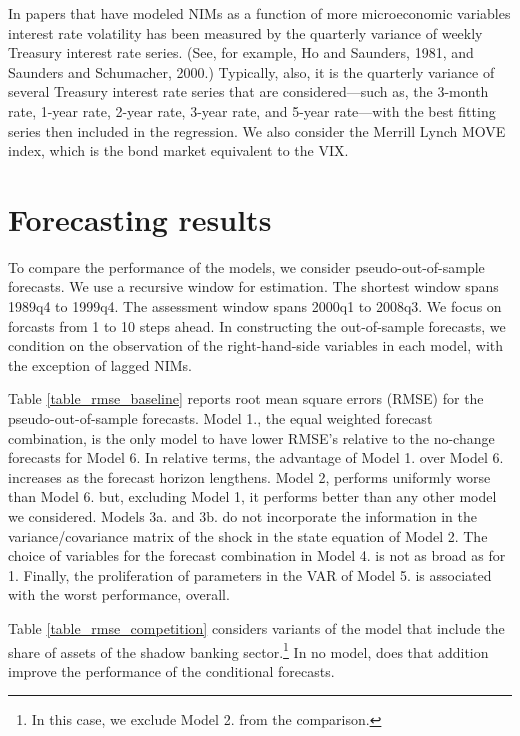 \documentclass[11pt]{article}
\renewcommand{\baselinestretch}{1.5}
\begin{document}
In papers that have modeled NIMs as a function of more microeconomic variables interest rate volatility has been measured by
the quarterly variance of weekly Treasury interest rate series. (See, for example, Ho and Saunders, 1981, and Saunders
and Schumacher, 2000.)  Typically, also, it is the quarterly variance of several Treasury interest rate series that are
considered---such as, the 3-month rate, 1-year rate, 2-year rate, 3-year rate, and 5-year rate---with the best fitting series then
included in the regression.  We also consider the Merrill Lynch MOVE index, which is the bond market equivalent to the VIX.

\section{Forecasting results}

To compare the performance of the models, we consider pseudo-out-of-sample forecasts. We use a recursive window for estimation. The shortest window spans 1989q4 to 1999q4. The assessment window spans 2000q1 to 2008q3. We focus on forcasts from 1 to 10 steps ahead. In constructing the out-of-sample forecasts, we condition on the observation of the right-hand-side variables in each model, with the exception of lagged NIMs.

Table \ref{table_rmse_baseline} reports root mean square errors (RMSE) for the pseudo-out-of-sample forecasts.  Model 1., the equal weighted forecast combination, is the only model to have lower RMSE's relative to the no-change forecasts for Model 6. In relative terms, the advantage of Model 1. over Model 6. increases as the forecast horizon lengthens. Model 2, performs uniformly worse than Model 6. but, excluding Model 1, it performs better than any other model we considered. Models 3a. and 3b. do not incorporate the information in the variance/covariance matrix of the shock in the state equation of Model 2.  The choice of variables for the forecast combination in Model 4. is not as broad as for 1. Finally, the proliferation of parameters in the VAR of Model 5. is associated with the worst performance, overall.

Table \ref{table_rmse_competition} considers variants of the model that include the share of assets of the shadow banking sector.\renewcommand{\baselinestretch}{1.0}\footnote{In this case, we exclude Model 2. from the comparison.\vspace{0.05in}}\renewcommand{\baselinestretch}{1.5}   In no model, does that addition  improve the performance of the conditional forecasts.
\end{document}
